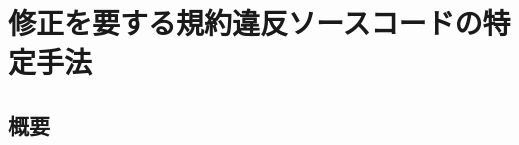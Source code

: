 \documentclass[11pt,dvipdfmx]{jreport}
\begin{document}





\chapter{修正を要する規約違反ソースコードの特定手法}\label{chap:approach}

\section{概要}
\end{document}
